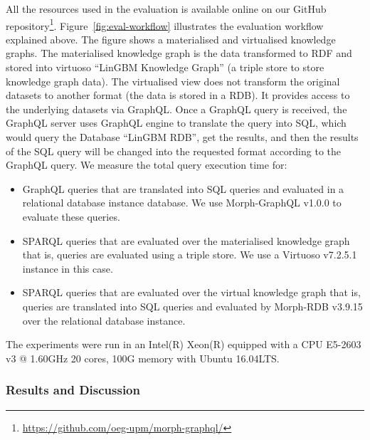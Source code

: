 All the resources used in the evaluation is available online on our GitHub repository\footnote{\url{https://github.com/oeg-upm/morph-graphql/}}.
Figure~\ref{fig:eval-workflow} illustrates the evaluation workflow explained above. The figure shows a materialised and virtualised knowledge graphs. The materialised knowledge graph is the data transformed to RDF and stored into virtuoso ``LinGBM Knowledge Graph'' (a triple store to store knowledge graph data).
The virtualised view does not transform the original datasets to another format (the data is stored in a RDB). It provides access to the underlying datasets via GraphQL. Once a GraphQL query is received, the GraphQL server uses GraphQL engine to translate the query into SQL, which would query the Database ``LinGBM RDB'', get the results, and then the results of the SQL query will be changed into the requested format according to the GraphQL query. We measure the total query execution time for:
\begin{itemize}
    \item GraphQL queries that are translated into SQL queries and evaluated in a relational database instance database. We use Morph-GraphQL v1.0.0 to evaluate these queries.
    \item SPARQL queries that are evaluated over the materialised knowledge graph that is, queries are evaluated using a triple store. We use a Virtuoso v7.2.5.1 instance in this case.
    \item SPARQL queries that are evaluated over the virtual knowledge graph that is, queries are translated into SQL queries and evaluated by Morph-RDB v3.9.15 over the relational database instance. 
\end{itemize}
The experiments were run in an Intel(R) Xeon(R) equipped with a CPU E5-2603 v3 @ 1.60GHz 20 cores, 100G memory with Ubuntu 16.04LTS.

\subsubsection{Results and Discussion}

